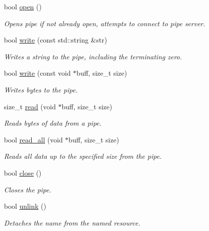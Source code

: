 \begin{DoxyCompactItemize}
bool \hyperlink{classcpen333_1_1process_1_1posix_1_1pipe_a256fbc6e54cf558ee06c5f3b65d5dc23}{open} ()
\begin{DoxyCompactList}\small\item\em Opens pipe if not already open, attempts to connect to pipe server. \end{DoxyCompactList}\item 
bool \hyperlink{classcpen333_1_1process_1_1posix_1_1pipe_a6aeb644645944b435c32928db1349aa7}{write} (const std\+::string \&str)
\begin{DoxyCompactList}\small\item\em Writes a string to the pipe, including the terminating zero. \end{DoxyCompactList}\item 
bool \hyperlink{classcpen333_1_1process_1_1posix_1_1pipe_abb450a7e724dd5ad8fc364b2cc75c311}{write} (const void $\ast$buff, size\+\_\+t size)
\begin{DoxyCompactList}\small\item\em Writes bytes to the pipe. \end{DoxyCompactList}\item 
size\+\_\+t \hyperlink{classcpen333_1_1process_1_1posix_1_1pipe_a20e936e70690065c30f0600aa8f1b0d3}{read} (void $\ast$buff, size\+\_\+t size)
\begin{DoxyCompactList}\small\item\em Reads bytes of data from a pipe. \end{DoxyCompactList}\item 
bool \hyperlink{classcpen333_1_1process_1_1posix_1_1pipe_a8697e5c707442bce2eae0b9afbf44ac1}{read\+\_\+all} (void $\ast$buff, size\+\_\+t size)
\begin{DoxyCompactList}\small\item\em Reads all data up to the specified size from the pipe. \end{DoxyCompactList}\item 
bool \hyperlink{classcpen333_1_1process_1_1posix_1_1pipe_af36dacdb81426f3dc76904bdcf1afc8f}{close} ()
\begin{DoxyCompactList}\small\item\em Closes the pipe. \end{DoxyCompactList}\item 
bool \hyperlink{classcpen333_1_1process_1_1posix_1_1pipe_ac1dd8e1a7fd46480b709e96190afe697}{unlink} ()
\begin{DoxyCompactList}\small\item\em Detaches the name from the named resource. \end{DoxyCompactList}\end{DoxyCompactItemize}
